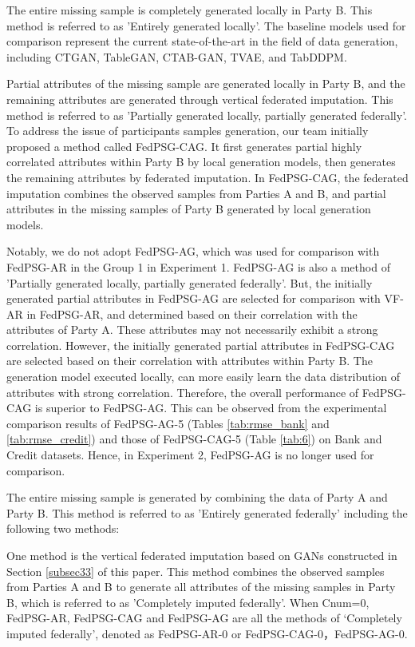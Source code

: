 \documentclass[final,1p,times]{elsarticle}
\begin{document}
 The entire missing sample is completely generated locally in Party B. This method is referred to as 'Entirely generated locally'. The baseline models used for comparison represent the current state-of-the-art in the field of data generation, including CTGAN\cite{11}, TableGAN\cite{38}, CTAB-GAN\cite{15}, TVAE\cite{11}, and TabDDPM\cite{17}.

 Partial attributes of the missing sample are generated locally in Party B, and the remaining attributes are generated through vertical federated imputation. This method is referred to as 'Partially generated locally, partially generated federally'. To address the issue of participants samples generation, our team initially proposed a method called FedPSG-CAG. It first generates partial highly correlated attributes within Party B by local generation models, then generates the remaining attributes by federated imputation. In FedPSG-CAG, the federated imputation combines the observed samples from Parties A and B, and partial attributes in the missing samples of Party B generated by local generation models. 

Notably, we do not adopt FedPSG-AG, which was used for comparison with FedPSG-AR in the Group 1 in Experiment 1. FedPSG-AG is also a method of 'Partially generated locally, partially generated federally'. But, the initially generated partial attributes in FedPSG-AG are selected for comparison with VF-AR in FedPSG-AR, and determined based on their correlation with the attributes of Party A. These attributes may not necessarily exhibit a strong correlation. However, the initially generated partial attributes in FedPSG-CAG are selected based on their correlation with attributes within Party B. The generation model executed locally, can more easily learn the data distribution of attributes with strong correlation. Therefore, the overall performance of FedPSG-CAG is superior to FedPSG-AG. This can be observed from the experimental comparison results of FedPSG-AG-5 (Tables \ref{tab:rmse_bank} and \ref{tab:rmse_credit}) and those of FedPSG-CAG-5 (Table \ref{tab:6}) on Bank and Credit datasets. Hence, in Experiment 2, FedPSG-AG is no longer used for comparison.

The entire missing sample is generated by combining the data of Party A and Party B. This method is referred to as 'Entirely generated federally' including the following two methods:

One method is the vertical federated imputation based on GANs constructed in Section \ref{subsec33} of this paper. This method combines the observed samples from Parties A and B to generate all attributes of the missing samples in Party B, which is referred to as 'Completely imputed federally'. When Cnum=0, FedPSG-AR, FedPSG-CAG and FedPSG-AG are all the methods of ‘Completely imputed federally’, denoted as FedPSG-AR-0 or FedPSG-CAG-0，FedPSG-AG-0.
\end{document}
